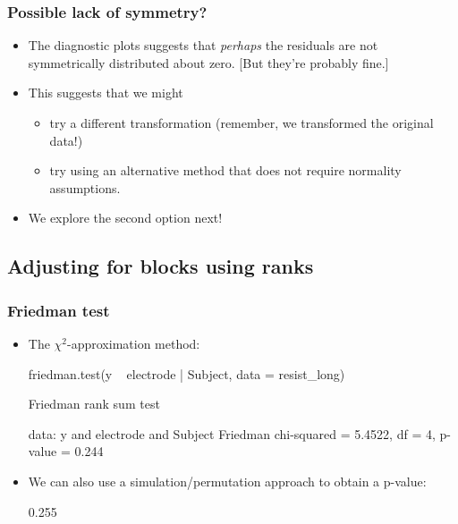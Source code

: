 \documentclass[a4paper]{article}
\begin{document}
\subsubsection{Possible lack of symmetry?}
\begin{itemize}
	\item The diagnostic plots suggests that \textit{perhaps} the residuals are not symmetrically distributed about zero. [But they're probably fine.]
	\item This suggests that we might
	\begin{itemize}
		\item try a different transformation (remember, we transformed the original data!)
		\item try using an alternative method that does not require normality assumptions.
	\end{itemize}
	\item We explore the second option next!
\end{itemize}
\subsection{Adjusting for blocks using ranks}
\subsubsection{Friedman test}
\begin{itemize}
	\item The \( \chi^2 \)-approximation method:
\begin{Schunk}
\begin{Sinput}
friedman.test(y ~ electrode | Subject, data = resist_long)
\end{Sinput}
\begin{Soutput}

	Friedman rank sum test

data:  y and electrode and Subject
Friedman chi-squared = 5.4522, df = 4, p-value = 0.244
\end{Soutput}
\end{Schunk}
\item We can also use a simulation/permutation approach to obtain a p-value:
\begin{Schunk}
\begin{Soutput}
[1] 0.255
\end{Soutput}
\end{Schunk}
\end{itemize}
\end{document}
